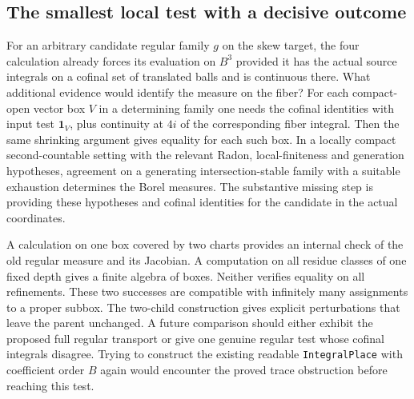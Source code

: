 \documentclass[12pt,letterpaper]{article}
\newcommand{\id}[1]{{\small\nolinkurl{#1}}}
\begin{document}
\subsection{The smallest local test with a decisive outcome}
For an arbitrary candidate regular family $g$ on the skew target, the four calculation already forces its evaluation on $B^3$ provided it has the actual source integrals on a cofinal set of translated balls and is continuous there. What additional evidence would identify the measure on the fiber? For each compact-open vector box $V$ in a determining family one needs the cofinal identities with input test $\mathbf1_V$, plus continuity at $4i$ of the corresponding fiber integral. Then the same shrinking argument gives equality for each such box. In a locally compact second-countable setting with the relevant Radon, local-finiteness and generation hypotheses, agreement on a generating intersection-stable family with a suitable exhaustion determines the Borel measures. The substantive missing step is providing these hypotheses and cofinal identities for the candidate in the actual coordinates.

A calculation on one box covered by two charts provides an internal check of the old regular measure and its Jacobian. A computation on all residue classes of one fixed depth gives a finite algebra of boxes. Neither verifies equality on all refinements. These two successes are compatible with infinitely many assignments to a proper subbox. The two-child construction gives explicit perturbations that leave the parent unchanged. A future comparison should either exhibit the proposed full regular transport or give one genuine regular test whose cofinal integrals disagree. Trying to construct the existing readable \id{IntegralPlace} with coefficient order $B$ again would encounter the proved trace obstruction before reaching this test.
\end{document}
